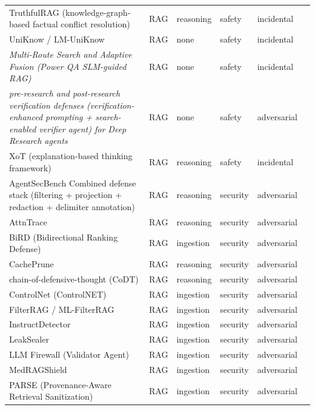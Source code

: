 \begin{longtable}{@{}>{\raggedright\arraybackslash}p{}lllll@{}}
TruthfulRAG (knowledge-graph-based factual conflict resolution) & RAG & reasoning & safety & incidental & \cite{liu-2026-truthfulrag} \\
UniKnow / LM-UniKnow & RAG & none & safety & incidental & \cite{kim-2025-uniknow} \\
\emph{Multi-Route Search and Adaptive Fusion (Power QA SLM-guided RAG)} & RAG & none & safety & incidental & \cite{shen-2026-multiroute} \\
\emph{pre-research and post-research verification defenses (verification-enhanced prompting + search-enabled verifier agent) for Deep Research agents} & RAG & none & safety & adversarial & \cite{zhu-2026-deep} \\
XoT (explanation-based thinking framework) & RAG & reasoning & safety & incidental & \cite{zhao-2026-exploring} \\
AgentSecBench Combined defense stack (filtering + projection + redaction + delimiter annotation) & RAG & reasoning & security & adversarial & \cite{alpay-2026-agentsecbench} \\
AttnTrace & RAG & reasoning & security & adversarial & \cite{wang-2025-attntrace} \\
BiRD (Bidirectional Ranking Defense) & RAG & ingestion & security & adversarial & \cite{gao-2026-bird} \\
CachePrune & RAG & reasoning & security & adversarial & \cite{wang-2025-cacheprune} \\
chain-of-defensive-thought (CoDT) & RAG & reasoning & security & adversarial & \cite{wang-2025-chainofdefensivethought} \\
ControlNet (ControlNET) & RAG & ingestion & security & adversarial & \cite{yao-2025-controlnet} \\
FilterRAG / ML-FilterRAG & RAG & ingestion & security & adversarial & \cite{edemacu-2025-defending} \\
InstructDetector & RAG & ingestion & security & adversarial & \cite{wen-2025-defending} \\
LeakSealer & RAG & ingestion & security & adversarial & \cite{panebianco-2025-leaksealer} \\
LLM Firewall (Validator Agent) & RAG & ingestion & security & adversarial & \cite{podpora-2025-llm} \\
MedRAGShield & RAG & ingestion & security & adversarial & \cite{shanid-2026-medragshield} \\
PARSE (Provenance-Aware Retrieval Sanitization) & RAG & ingestion & security & adversarial & \cite{pai-2026-parse} \\

\end{longtable}

